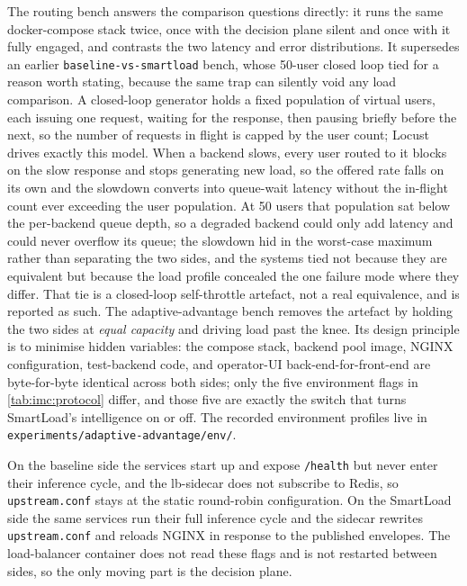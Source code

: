 The routing bench answers the comparison questions directly: it runs the same
docker-compose stack twice, once with the decision plane silent and once with it fully
engaged, and contrasts the two latency and error distributions. It supersedes an
earlier \texttt{baseline-vs-smartload} bench, whose 50-user closed loop tied for a
reason worth stating, because the same trap can silently void any load comparison. A
closed-loop generator holds a fixed population of virtual users, each issuing one
request, waiting for the response, then pausing briefly before the next, so the number
of requests in flight is capped by the user count; Locust drives exactly this model.
When a backend slows, every user routed to it blocks on the slow response and stops
generating new load, so the offered rate falls on its own and the slowdown converts into
queue-wait latency without the in-flight count ever exceeding the user population. At
50 users that population sat below the per-backend queue depth, so a degraded backend
could only add latency and could never overflow its queue; the slowdown hid in the
worst-case maximum rather than separating the two sides, and the systems tied not because
they are equivalent but because the load profile concealed the one failure mode where
they differ. That tie is a closed-loop self-throttle artefact, not a real equivalence,
and is reported as such. The
adaptive-advantage bench removes the artefact by holding the two sides at \emph{equal
capacity} and driving load past the knee. Its design principle is to minimise hidden
variables: the compose stack, backend pool image, NGINX configuration, test-backend
code, and operator-UI back-end-for-front-end are byte-for-byte identical across both
sides; only the five environment flags in \cref{tab:imc:protocol} differ, and those five
are exactly the switch that turns SmartLoad's intelligence on or off. The recorded
environment profiles live in \texttt{experiments/adaptive-advantage/env/}.

On the baseline side the services start up and expose \texttt{/health} but never enter
their inference cycle, and the lb-sidecar does not subscribe to Redis, so
\texttt{upstream.conf} stays at the static round-robin configuration. On the SmartLoad
side the same services run their full inference cycle and the sidecar rewrites
\texttt{upstream.conf} and reloads NGINX in response to the published envelopes. The
load-balancer container does not read these flags and is not restarted between sides,
so the only moving part is the decision plane.

